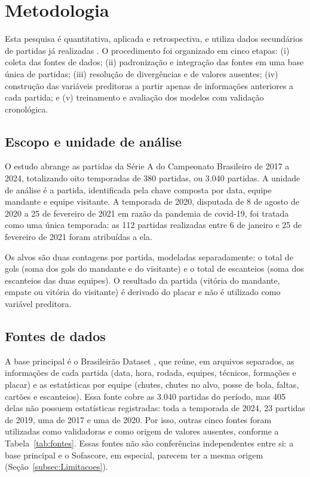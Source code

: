 \section{Metodologia}\label{sec:Method}

Esta pesquisa é quantitativa, aplicada e retrospectiva, e utiliza dados secundários de partidas já realizadas \cite{wazlawick2014,marconiLakatos2021}. O procedimento foi organizado em cinco etapas: (i) coleta das fontes de dados; (ii) padronização e integração das fontes em uma base única de partidas; (iii) resolução de divergências e de valores ausentes; (iv) construção das variáveis preditoras a partir apenas de informações anteriores a cada partida; e (v) treinamento e avaliação dos modelos com validação cronológica.

\subsection{Escopo e unidade de análise}\label{subsec:Escopo}

O estudo abrange as partidas da Série A do Campeonato Brasileiro de 2017 a 2024, totalizando oito temporadas de 380 partidas, ou 3.040 partidas. A unidade de análise é a partida, identificada pela chave composta por data, equipe mandante e equipe visitante. A temporada de 2020, disputada de 8 de agosto de 2020 a 25 de fevereiro de 2021 em razão da pandemia de covid-19, foi tratada como uma única temporada: as 112 partidas realizadas entre 6 de janeiro e 25 de fevereiro de 2021 foram atribuídas a ela.

Os alvos são duas contagens por partida, modeladas separadamente: o total de gols (soma dos gols do mandante e do visitante) e o total de escanteios (soma dos escanteios das duas equipes). O resultado da partida (vitória do mandante, empate ou vitória do visitante) é derivado do placar e não é utilizado como variável preditora.

\subsection{Fontes de dados}\label{subsec:Fontes}

A base principal é o Brasileirão Dataset \cite{brasileiraoDatasetGithub}, que reúne, em arquivos separados, as informações de cada partida (data, hora, rodada, equipes, técnicos, formações e placar) e as estatísticas por equipe (chutes, chutes no alvo, posse de bola, faltas, cartões e escanteios). Essa fonte cobre as 3.040 partidas do período, mas 405 delas não possuem estatísticas registradas: toda a temporada de 2024, 23 partidas de 2019, uma de 2017 e uma de 2020. Por isso, outras cinco fontes foram utilizadas como validadoras e como origem de valores ausentes, conforme a Tabela~\ref{tab:fontes}. Essas fontes não são conferências independentes entre si: a base principal e o Sofascore, em especial, parecem ter a mesma origem (Seção~\ref{subsec:Limitacoes}).

